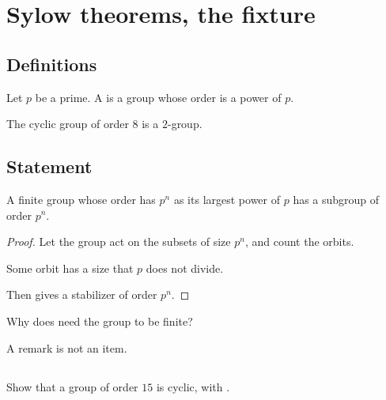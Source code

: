 \chapter{Sylow theorems, the fixture}
\section{Definitions}

\begin{definition}
Let $p$ be a prime. A  is a group whose order is a power
of $p$.
\end{definition}

\begin{example}
The cyclic group of order $8$ is a $2$-group.
\end{example}

\section{Statement}

\begin{theorem}[Sylow]
	\label{thm:sylow}
	A finite group whose order has $p^n$ as its largest power of $p$ has a
	subgroup of order $p^n$.
\end{theorem}
\begin{proof}
	Let the group act on the subsets of size $p^n$, and count the orbits.
	\begin{lemma}
		\label{lem:orbit-count}
		Some orbit has a size that $p$ does not divide.
	\end{lemma}
	Then  gives a stabilizer of order $p^n$.
\end{proof}

\begin{ques}
Why does  need the group to be finite?
\end{ques}

\begin{remark}
A remark is not an item.
\end{remark}

\section{\problemhead}

\begin{dproblem}
Show that a group of order $15$ is cyclic, with .
\end{dproblem}
